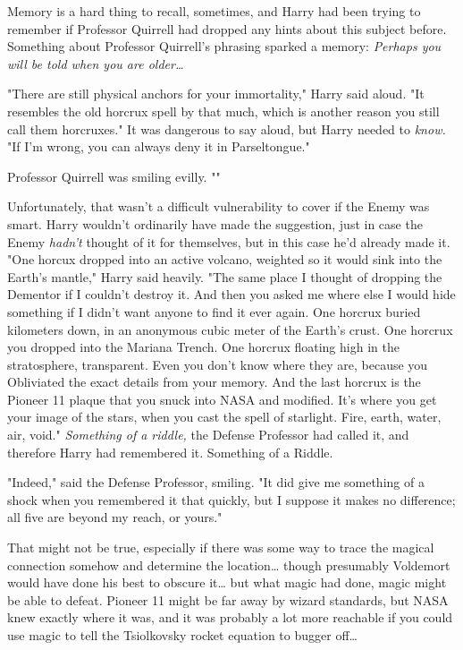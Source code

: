 Memory is a hard thing to recall, sometimes, and Harry had been trying to
remember if Professor Quirrell had dropped any hints about this subject before.
Something about Professor Quirrell's phrasing sparked a memory: \emph{Perhaps
you will be told when you are older{\ldots}}

"There are still physical anchors for your immortality," Harry said aloud. "It
resembles the old horcrux spell by that much, which is another reason you still
call them horcruxes." It was dangerous to say aloud, but Harry needed to
\emph{know.} "If I'm wrong, you can always deny it in Parseltongue."

Professor Quirrell was smiling evilly. ""

Unfortunately, that wasn't a difficult vulnerability to cover if the Enemy was
smart. Harry wouldn't ordinarily have made the suggestion, just in case the
Enemy \emph{hadn't} thought of it for themselves, but in this case he'd already
made it. "One horcux dropped into an active volcano, weighted so it would sink
into the Earth's mantle," Harry said heavily. "The same place I thought of
dropping the Dementor if I couldn't destroy it. And then you asked me where
else I would hide something if I didn't want anyone to find it ever again. One
horcrux buried kilometers down, in an anonymous cubic meter of the Earth's
crust. One horcrux you dropped into the Mariana Trench. One horcrux floating
high in the stratosphere, transparent. Even you don't know where they are,
because you Obliviated the exact details from your memory. And the last horcrux
is the Pioneer 11 plaque that you snuck into NASA and modified. It's where you
get your image of the stars, when you cast the spell of starlight. Fire, earth,
water, air, void." \emph{Something of a riddle,} the Defense Professor had
called it, and therefore Harry had remembered it. Something of a Riddle.

"Indeed," said the Defense Professor, smiling. "It did give me something of a
shock when you remembered it that quickly, but I suppose it makes no
difference; all five are beyond my reach, or yours."

That might not be true, especially if there was some way to trace the magical
connection somehow and determine the location{\ldots} though presumably
Voldemort would have done his best to obscure it{\ldots} but what magic had
done, magic might be able to defeat. Pioneer 11 might be far away by wizard
standards, but NASA knew exactly where it was, and it was probably a lot more
reachable if you could use magic to tell the Tsiolkovsky rocket equation to
bugger off{\ldots}

